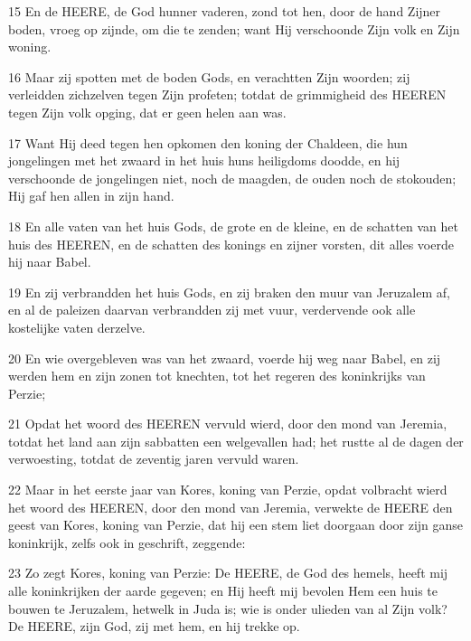 \par 15 En de HEERE, de God hunner vaderen, zond tot hen, door de hand Zijner boden, vroeg op zijnde, om die te zenden; want Hij verschoonde Zijn volk en Zijn woning.
\par 16 Maar zij spotten met de boden Gods, en verachtten Zijn woorden; zij verleidden zichzelven tegen Zijn profeten; totdat de grimmigheid des HEEREN tegen Zijn volk opging, dat er geen helen aan was.
\par 17 Want Hij deed tegen hen opkomen den koning der Chaldeen, die hun jongelingen met het zwaard in het huis huns heiligdoms doodde, en hij verschoonde de jongelingen niet, noch de maagden, de ouden noch de stokouden; Hij gaf hen allen in zijn hand.
\par 18 En alle vaten van het huis Gods, de grote en de kleine, en de schatten van het huis des HEEREN, en de schatten des konings en zijner vorsten, dit alles voerde hij naar Babel.
\par 19 En zij verbrandden het huis Gods, en zij braken den muur van Jeruzalem af, en al de paleizen daarvan verbrandden zij met vuur, verdervende ook alle kostelijke vaten derzelve.
\par 20 En wie overgebleven was van het zwaard, voerde hij weg naar Babel, en zij werden hem en zijn zonen tot knechten, tot het regeren des koninkrijks van Perzie;
\par 21 Opdat het woord des HEEREN vervuld wierd, door den mond van Jeremia, totdat het land aan zijn sabbatten een welgevallen had; het rustte al de dagen der verwoesting, totdat de zeventig jaren vervuld waren.
\par 22 Maar in het eerste jaar van Kores, koning van Perzie, opdat volbracht wierd het woord des HEEREN, door den mond van Jeremia, verwekte de HEERE den geest van Kores, koning van Perzie, dat hij een stem liet doorgaan door zijn ganse koninkrijk, zelfs ook in geschrift, zeggende:
\par 23 Zo zegt Kores, koning van Perzie: De HEERE, de God des hemels, heeft mij alle koninkrijken der aarde gegeven; en Hij heeft mij bevolen Hem een huis te bouwen te Jeruzalem, hetwelk in Juda is; wie is onder ulieden van al Zijn volk? De HEERE, zijn God, zij met hem, en hij trekke op.



